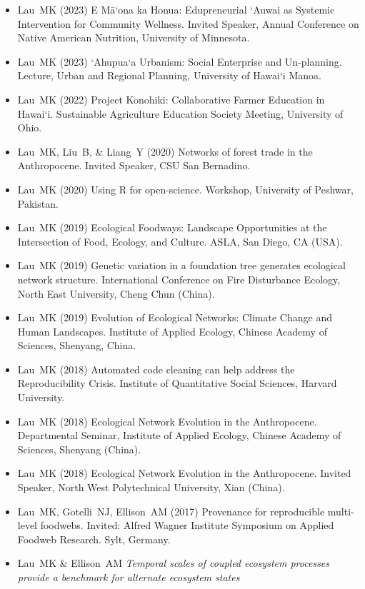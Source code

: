 \documentclass[a4paper]{article}
\begin{document}
\begin{itemize}
\item Lau~MK (2023) E M\={a}‘ona ka Honua: Edupreneurial ‘Auwai as
  Systemic Intervention for Community Wellness. Invited Speaker,
  Annual Conference on Native American Nutrition, University of Minnesota. 
\item Lau~MK (2023) ‘Ahupua‘a Urbanism: Social Enterprise and
  Un-planning. Lecture, Urban and Regional Planning, University of
  Hawai‘i Manoa.  
\item Lau~MK (2022) Project Konohiki: Collaborative Farmer Education
  in Hawai‘i. Sustainable Agriculture Education Society
  Meeting, University of Ohio. 
\item Lau~MK, Liu~B, \& Liang~Y (2020) Networks of forest trade in the
  Anthropocene. Invited Speaker, CSU San Bernadino.
\item Lau~MK (2020) Using R for open-science. Workshop, University of
  Peshwar, Pakistan. 
\item Lau~MK (2019) Ecological Foodways: Landscape Opportunities at
  the Intersection of Food, Ecology, and Culture. ASLA, San Diego, CA
  (USA).
\item Lau~MK (2019) Genetic variation in a foundation tree generates
  ecological network structure. International Conference on Fire
  Disturbance Ecology, North East University, Cheng Chun (China).
\item Lau~MK (2019) Evolution of Ecological Networks: Climate Change
  and Human Landscapes. Institute of Applied Ecology, Chinese Academy
  of Sciences, Shenyang, China.
\item Lau~MK (2018) Automated code cleaning can help address the
  Reproducibility Crisis. Institute of Quantitative Social Sciences,
  Harvard University.
\item Lau~MK (2018) Ecological Network Evolution in the
  Anthropocene. Departmental Seminar, Institute of Applied Ecology,
  Chinese Academy of Sciences, Shenyang (China).
\item Lau~MK (2018) Ecological Network Evolution in the
  Anthropocene. Invited Speaker, North West Polytechnical University,
  Xian (China).
\item Lau~MK, Gotelli~NJ, Ellison~AM (2017) Provenance for
  reproducible multi-level foodwebs. Invited: Alfred Wagner Institute
  Symposium on Applied Foodweb Research. Sylt, Germany. 
\item Lau~MK \& Ellison~AM \emph{Temporal scales of coupled ecosystem
  processes provide a benchmark for alternate ecosystem states
}
\end{itemize}
\end{document}
